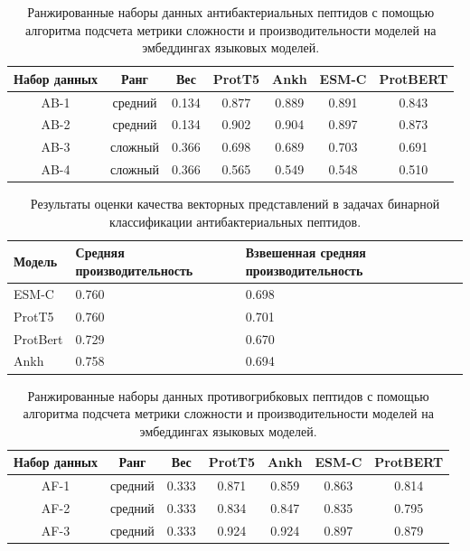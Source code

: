 \documentclass[specification,annotation,times]{itmo-student-thesis}
\begin{document}
\begin{table}[h]
\centering
\caption{Ранжированные наборы данных антибактериальных пептидов с помощью алгоритма подсчета метрики сложности и производительности моделей на эмбеддингах языковых моделей.}
\label{tab:model_performance_ab}

\begin{tabular}{|c|c|c|c|c|c|c|}
\hline
Набор данных & Ранг & Вес & ProtT5 & Ankh & ESM-C & ProtBERT \\
\hline
AB-1 & средний & 0.134 & 0.877 & 0.889 & 0.891 & 0.843 \\ \hline
AB-2 & средний & 0.134 & 0.902 & 0.904 & 0.897 & 0.873 \\ \hline
AB-3 & сложный & 0.366 & 0.698 & 0.689 & 0.703 & 0.691 \\ \hline
AB-4 & сложный & 0.366 & 0.565 & 0.549 & 0.548 & 0.510 \\ \hline
\end{tabular}

\end{table}


\begin{table}[h]
\centering

\caption{Результаты оценки качества векторных представлений в задачах бинарной классификации антибактериальных пептидов.}
\label{tab:compare_results_ab}
\begin{tabular}{|p{3cm}|p{5cm}|p{5cm}|}
\hline
Модель & Средняя \newline производительность & Взвешенная \newline средняя \newline производительность \\
\hline
ESM-C & 0.760 & 0.698 \\ \hline
ProtT5 & 0.760 & 0.701 \\ \hline
ProtBert & 0.729 & 0.670 \\ \hline
Ankh & 0.758 & 0.694 \\ \hline
\end{tabular}

\end{table}

\begin{table}[h]
\centering
\caption{Ранжированные наборы данных противогрибковых пептидов с помощью алгоритма подсчета метрики сложности и производительности моделей на эмбеддингах языковых моделей.}
\label{tab:model_performance_af}

\begin{tabular}{|c|c|c|c|c|c|c|}
\hline
Набор данных & Ранг & Вес & ProtT5 & Ankh & ESM-C & ProtBERT \\
\hline
AF-1 & средний & 0.333 & 0.871 & 0.859 & 0.863 & 0.814 \\ \hline
AF-2 & средний & 0.333 & 0.834 & 0.847 & 0.835 & 0.795 \\ \hline
AF-3 & средний & 0.333 & 0.924 & 0.924 & 0.897 & 0.879 \\ \hline
\end{tabular}

\end{table}
\end{document}
